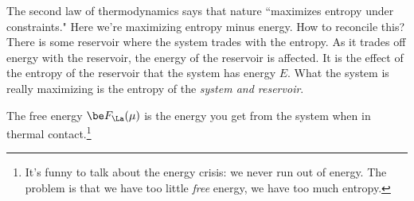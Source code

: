 The second law of thermodynamics says that nature ``maximizes entropy under constraints." %
Here we're maximizing entropy minus energy. How to reconcile this? 
There is some reservoir where the system trades with the entropy. As it trades off energy with the reservoir, the energy of the reservoir is affected. It is the effect of the entropy of the reservoir that the system has energy $E$. What the system is really maximizing is the entropy of the \emph{system and reservoir}.

The free energy $\be F_{\La}(\mu)$ is the energy you get from the system when in thermal contact.\footnote{It's funny to talk about the energy crisis: we never run out of energy. The problem is that we have too little \emph{free} energy, we have too much entropy.}


